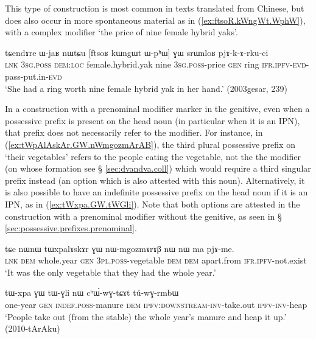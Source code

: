 This type of construction is most common in texts translated from Chinese, but does also occur in more spontaneous material as in (\ref{ex:ftsoR.kWngWt.WphW}), with a complex modifier  `the price of nine female hybrid yaks'.

\begin{exe}
\ex \label{ex:ftsoR.kWngWt.WphW}
\gll tɕendɤre ɯ-jaʁ nɯtɕu [ftsoʁ kɯngɯt ɯ-pʰɯ] ɣɯ srɯnloʁ pjɤ-k-ɤ-rku-ci \\
\textsc{lnk} \textsc{3sg}.\textsc{poss} \textsc{dem}:\textsc{loc} female.hybrid.yak nine \textsc{3sg}.\textsc{poss}-price \textsc{gen} ring \textsc{ifr}.\textsc{ipfv}-\textsc{evd}-pass-put.in-\textsc{evd} \\
\glt `She had a ring worth nine female hybrid yak in her hand.' (2003gesar, 239)
\end{exe}

In a construction with a prenominal modifier marker in the genitive, even when a possessive prefix is present on the head noun (in particular when it is an IPN), that prefix does not necessarily refer to the modifier. For instance, in (\ref{ex:tWpAlAskAr.GW.nWmgozmArAB}), the third plural possessive prefix  on  `their vegetables' refers to the people eating the vegetable, not the the modifier  (on whose formation see § \ref{sec:dvandva.coll}) which would require a third singular prefix instead (an option which is also attested with this noun). Alternatively, it is also possible to have an indefinite possessive prefix on the head noun if it is an IPN, as in (\ref{ex:tWxpa.GW.tWGli}). Note that both options are attested in the construction with a prenominal modifier without the genitive, as seen in § \ref{sec:possessive.prefixes.prenominal}.
 
 \begin{exe}
\ex \label{ex:tWpAlAskAr.GW.nWmgozmArAB}
\gll  tɕe nɯnɯ tɯxpalɤskɤr ɣɯ nɯ-mgozmɤrɤβ nɯ nɯ ma pjɤ-me.  \\
\textsc{lnk} \textsc{dem} whole.year \textsc{gen} \textsc{3pl}.\textsc{poss}-vegetable \textsc{dem} \textsc{dem} apart.from \textsc{ifr}.\textsc{ipfv}-not.exist \\
\glt `It was the only vegetable that they had the whole year.' 
\end{exe}

\begin{exe}
\ex \label{ex:tWxpa.GW.tWGli}
\gll  tɯ-xpa ɣɯ tɯ-ɣli nɯ cʰɯ́-wɣ-tɕɤt tú-wɣ-rmbɯ  \\
one-year \textsc{gen} \textsc{indef}.\textsc{poss}-manure \textsc{dem} \textsc{ipfv}:\textsc{downstream}-\textsc{inv}-take.out \textsc{ipfv}-\textsc{inv}-heap \\
\glt `People take out (from the stable) the whole year's manure and heap it up.' (2010-tArAku)
\end{exe}

